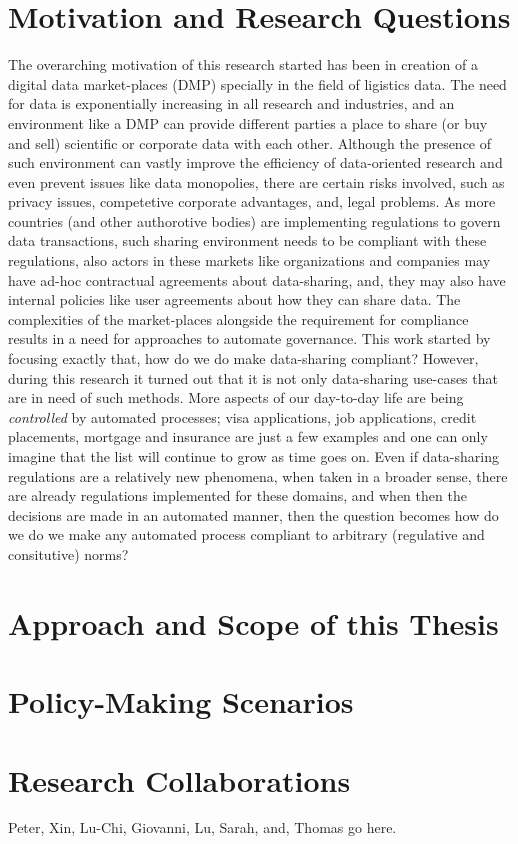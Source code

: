 \section{Motivation and Research Questions}
The overarching motivation of this research started has been in creation of a digital data market-places (DMP) specially in the field of ligistics data. The need for data is exponentially increasing in all research and industries, and an environment like a DMP can provide different parties a place to share (or buy and sell) scientific or corporate data with each other. Although the presence of such environment can vastly improve the efficiency of data-oriented research and even prevent issues like data monopolies, there are certain risks involved, such as privacy issues, competetive corporate advantages, and, legal problems. As more countries (and other authorotive bodies) are implementing regulations to govern data transactions, such sharing environment needs to be compliant with these regulations, also actors in these markets like organizations and companies may have ad-hoc contractual agreements about data-sharing, and, they may also have internal policies like user agreements about how they can share data. The complexities of the market-places alongside the requirement for compliance results in a need for approaches to automate governance. This work started by focusing exactly that, how do we do make data-sharing compliant? However, during this research it turned out that it is not only data-sharing use-cases that are in need of such methods. More aspects of our day-to-day life are being \textit{controlled} by automated processes; visa applications, job applications, credit placements, mortgage and insurance are just a few examples and one can only imagine that the list will continue to grow as time goes on. Even if data-sharing regulations are a relatively new phenomena, when taken in a broader sense, there are already regulations implemented for these domains, and when then the decisions are made in an automated manner, then the question becomes how do we do we make any automated process compliant to arbitrary (regulative and consitutive) norms?





\section{Approach and Scope of this Thesis}

\section{Policy-Making Scenarios}

\section{Research Collaborations}
Peter, Xin, Lu-Chi, Giovanni, Lu, Sarah, and, Thomas go here.